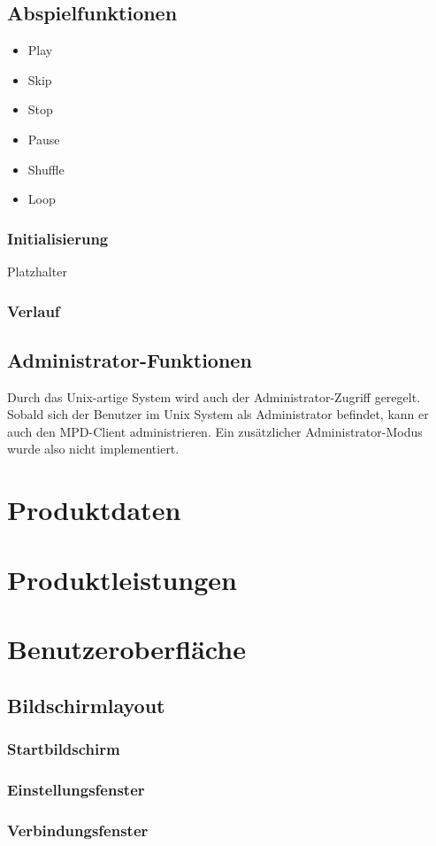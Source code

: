 \subsection{Abspielfunktionen}
\begin{itemize}
	\item Play
	\item Skip
	\item Stop
	\item Pause
	\item Shuffle
	\item Loop
\end{itemize}
\subsubsection{Initialisierung}
Platzhalter
\subsubsection{Verlauf}
\subsection{Administrator-Funktionen}
Durch das Unix-artige System wird auch der Administrator-Zugriff geregelt. Sobald sich der Benutzer im Unix System
als Administrator befindet, kann er auch den MPD-Client administrieren. Ein zusätzlicher Administrator-Modus wurde also
nicht implementiert.
\section{Produktdaten}
\section{Produktleistungen}
\section{Benutzeroberfläche}
\subsection{Bildschirmlayout}
\subsubsection{Startbildschirm}
\subsubsection{Einstellungsfenster}
\subsubsection{Verbindungsfenster}
